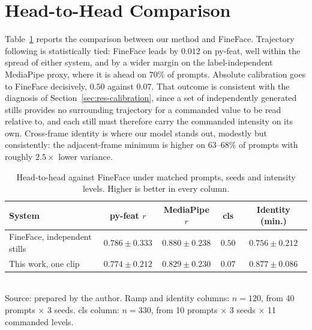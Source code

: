 \section{Head-to-Head Comparison}\label{sec:res-headtohead}


Table~\ref{tab:res-headtohead} reports the comparison between our method and FineFace. Trajectory
following is statistically tied: FineFace leads by $0.012$ on py-feat, well within the spread of either
system, and by a wider margin on the label-independent MediaPipe proxy, where it is ahead on
$70\%$ of prompts. Absolute calibration goes to FineFace decisively, $0.50$ against $0.07$. That
outcome is consistent with the diagnosis of Section~\ref{sec:res-calibration}, since a set of
independently generated stills provides no surrounding trajectory for a commanded value to be
read relative to, and each still must therefore carry the commanded intensity on its own.
Cross-frame identity is where our model stands out, modestly but consistently: the adjacent-frame minimum is
higher on $63$--$68\%$ of prompts with roughly $2.5\times$ lower variance.

\begin{table}[H]
    \centering
    \small
    \caption{Head-to-head against FineFace \citep{varanka2024fineface} under matched prompts, seeds and intensity levels. Higher is better in every column.}
    \label{tab:res-headtohead}
    \begin{tabular}{@{}lcccc@{}}
        \toprule
        System & py-feat $r$ & MediaPipe $r$ & \gls{cls} & Identity (min.) \\
        \midrule
        FineFace, independent stills & $0.786 \pm 0.333$ & $0.880 \pm 0.238$ & $0.50$ & $0.756 \pm 0.212$ \\
        This work, one clip          & $0.774 \pm 0.212$ & $0.829 \pm 0.230$ & $0.07$ & $0.877 \pm 0.086$ \\
        \bottomrule
    \end{tabular}\\[4pt]
    {\footnotesize Source: prepared by the author. Ramp and identity columns: $n=120$, from 40 prompts $\times$ 3 seeds. \gls{cls} column: $n=330$, from 10 prompts $\times$ 3 seeds $\times$ 11 commanded levels.}
    \end{table}

